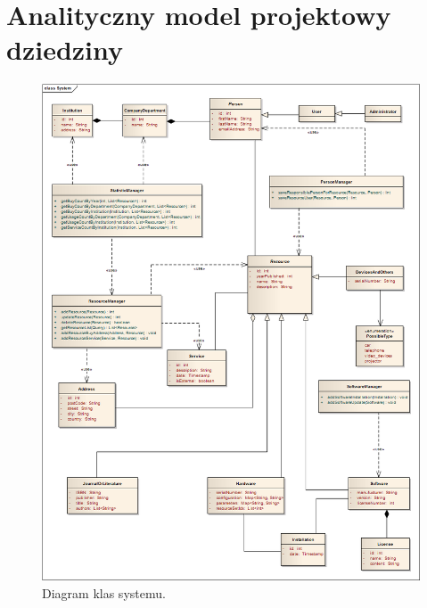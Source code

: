 \section{Analityczny model projektowy dziedziny}
\begin{figure}[h!]
	\centering
	\includegraphics[scale=0.4]{img/class-diagram2}
	\caption{Diagram klas systemu.\label{fig:labelClassDiagram}}
\end{figure}